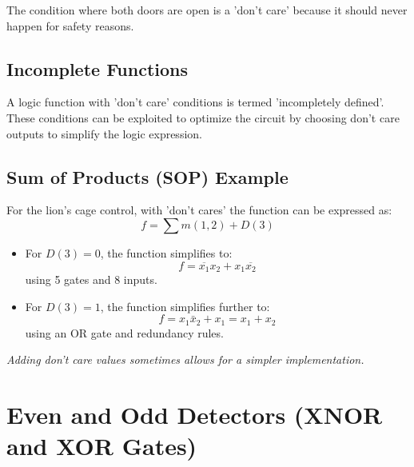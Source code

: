 \documentclass[12pt,openany]{book}
\begin{document}
			      	The condition where both doors are open is a 'don't care' because it should never happen for safety reasons.
			      	
			      	\subsection{Incomplete Functions}
			      	A logic function with 'don't care' conditions is termed 'incompletely defined'. These conditions can be exploited to optimize the circuit by choosing don't care outputs to simplify the logic expression.
			      	
			      	\subsection{Sum of Products (SOP) Example}
			      	For the lion's cage control, with 'don't cares' the function can be expressed as:
			      	\[ f = \sum m(1,2) + D(3) \]
			      	

				      	\begin{itemize}
							\setlength\itemsep{-2px}
				      		\item[] For \( D(3) = 0 \), the function simplifies to:
				      		      \[ f = \overline{x_1} x_2 + x_1 \overline{x_2} \]
				      		      using 5 gates and 8 inputs.
				      		\item[] For \( D(3) = 1 \), the function simplifies further to:
				      		      \[ f = x_1 \bar{x}_2 + x_1 = x_1 + x_2 \]
				      		      using an OR gate and redundancy rules.
				      	\end{itemize}


			      	
			      	\textit{Adding don't care values sometimes allows for a simpler implementation.}
			      	\section{Even and Odd Detectors (XNOR and XOR Gates)}
\end{document}
